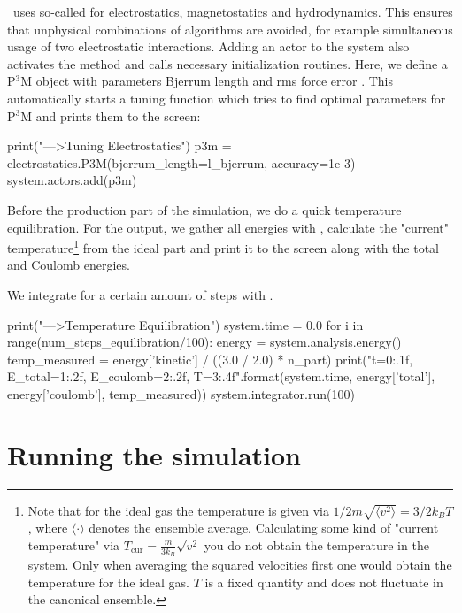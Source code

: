 \documentclass[
a4paper,                        %
11pt,                           %
twoside,                        %
footsepline,                    %
headsepline,                    %
headexclude,                    %
footexclude,                    %
pagesize,                       %
]{scrartcl}
\begin{document}
\es\ uses so-called  for electrostatics, magnetostatics and
hydrodynamics. This ensures that unphysical combinations of algorithms are
avoided, for example simultaneous usage of two electrostatic interactions.
Adding an actor to the system also activates the method and calls necessary
initialization routines. Here, we define a P$^3$M object with parameters Bjerrum
length and rms force error . This automatically starts a
tuning function which tries to find optimal parameters for P$^3$M and prints them
to the screen:

\begin{pypresso}
print("\n--->Tuning Electrostatics")
p3m = electrostatics.P3M(bjerrum_length=l_bjerrum, 
                         accuracy=1e-3)
system.actors.add(p3m)
\end{pypresso}

Before the production part of the simulation, we do a quick temperature 
equilibration. For the output, we gather all energies with
, calculate the "current" temperature\footnote{Note that for the ideal gas the temperature is given via $1/2 m \sqrt{\langle v^2 \rangle}=3/2 k_BT$, where $\langle \cdot \rangle$ denotes the ensemble average. Calculating some kind of "current temperature" via $T_\text{cur}=\frac{m}{3 k_B} \sqrt{ v^2 }$ you do not obtain the temperature in the system. Only when averaging the squared velocities first one would obtain the temperature for the ideal gas. $T$ is a fixed quantity and does not fluctuate in the canonical ensemble.} from the ideal part and 
print it to the screen along with the total and Coulomb energies.

We integrate for a certain amount of steps with .

\begin{pypresso}
print("\n--->Temperature Equilibration")
system.time = 0.0
for i in range(num_steps_equilibration/100):
    energy = system.analysis.energy()
    temp_measured = energy['kinetic'] / ((3.0 / 2.0) * n_part)
    print("t={0:.1f}, E_total={1:.2f}, E_coulomb={2:.2f}, 
          T={3:.4f}".format(system.time, energy['total'], 
          energy['coulomb'], temp_measured))
    system.integrator.run(100)
\end{pypresso}

\section{Running the simulation}
\end{document}
